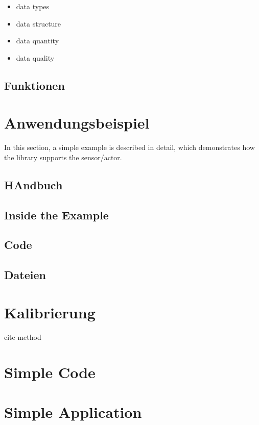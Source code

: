 \begin{itemize}
    \item data types
    \item data structure
    \item data quantity
    \item data quality
\end{itemize}

\subsection{Funktionen}

\section{Anwendungsbeispiel}

In this section, a simple example is described in detail, which demonstrates how the library supports the sensor/actor.


\subsection{HAndbuch}

\subsection{Inside the Example}

\subsection{Code}

\subsection{Dateien}



\section{Kalibrierung}

cite method

\section{Simple Code}


\section{Simple Application}



